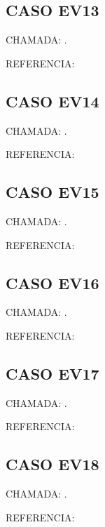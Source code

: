 \documentclass{undftex}
\begin{document}
\begin{refsection}\section*{CASO EV13} CHAMADA: . \textcite{ev13}\par REFERENCIA:\par\printbibliography[heading=none,check=undfconsultadas]\end{refsection}\clearpage
\begin{refsection}\section*{CASO EV14} CHAMADA: . \textcite{ev14}\par REFERENCIA:\par\printbibliography[heading=none,check=undfconsultadas]\end{refsection}\clearpage
\begin{refsection}\section*{CASO EV15} CHAMADA: . \textcite{ev15}\par REFERENCIA:\par\printbibliography[heading=none,check=undfconsultadas]\end{refsection}\clearpage
\begin{refsection}\section*{CASO EV16} CHAMADA: . \textcite{ev16}\par REFERENCIA:\par\printbibliography[heading=none,check=undfconsultadas]\end{refsection}\clearpage
\begin{refsection}\section*{CASO EV17} CHAMADA: . \textcite{ev17}\par REFERENCIA:\par\printbibliography[heading=none,check=undfconsultadas]\end{refsection}\clearpage
\begin{refsection}\section*{CASO EV18} CHAMADA: . \textcite{ev18}\par REFERENCIA:\par\printbibliography[heading=none,check=undfconsultadas]\end{refsection}\clearpage
\end{document}
